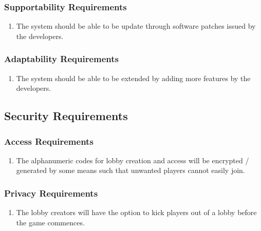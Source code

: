 \documentclass[12pt, titlepage]{article}
\begin{document}
    \subsubsection{Supportability Requirements}
    \label{ssub:supportability_requirements}
    \begin{enumerate}[label=MS\arabic*.]
        \item The system should be able to be update through software patches issued by the developers.
    \end{enumerate}
    
    \subsubsection{Adaptability Requirements}
    \label{ssub:adaptability_requirements}
    \begin{enumerate}[label=MS\arabic*.]
        \item The system should be able to be extended by adding more features by the developers.
    \end{enumerate}
    

\subsection{Security Requirements}
    \subsubsection{Access Requirements}
    \label{ssub:access_requirements}
    \begin{enumerate}[label=SR\arabic*.]
        \item The alphanumeric codes for lobby creation and access will be encrypted / generated by some means such that unwanted players cannot easily join.
    \end{enumerate}
    
    \subsubsection{Privacy Requirements}
    \label{ssub:privacy_requirements}
    \begin{enumerate}[label=SR\arabic*.]
        \item The lobby creators will have the option to kick players out of a lobby before the game commences.
    \end{enumerate}
\end{document}
